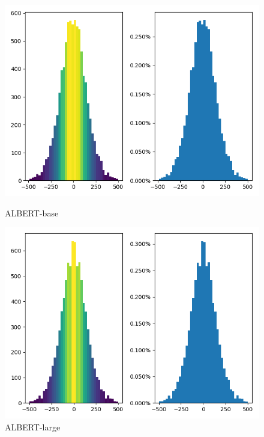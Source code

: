 \documentclass[letterpaper]{article} %
\begin{document}
\begin{figure}[!ht]
\centering
\begin{minipage}[b]{0.45\textwidth}
    \includegraphics[width=\textwidth]{SWOW_albert_base.png}
    \caption*{ALBERT-base}
  \end{minipage}
  \hfill
  \begin{minipage}[b]{0.45\textwidth}
    \includegraphics[width=\textwidth]{SWOW_albert_large.png}
    \caption*{ALBERT-large}
  \end{minipage}
\hfill
\begin{minipage}[b]{0.45\textwidth}

\end{minipage}
\end{figure}
\end{document}
